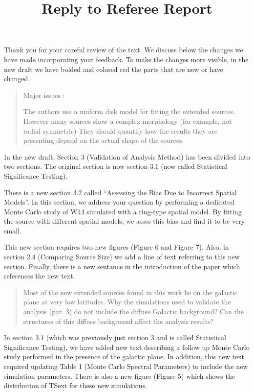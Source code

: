 \documentclass{article}
\title{Reply to Referee Report}
\newenvironment{referee}
{\begin{quote}\color{red}}
  {\end{quote}}
\newenvironment{reply}
  {}
  {}
\begin{document}
\maketitle

\begin{reply}
Thank you for your careful review of the text. We discuss below the
changes we have made incorporating your feedback. To make the changes more visible,
in the new draft we have bolded and colored red the parts that are new or have changed.
\end{reply}

\begin{referee}
Major issues :

The authors use a uniform disk model for fitting the extended sources.
However many sources show a complex morphology (for example, not radial symmetric)
They should quantify how the results they are presenting depend on the actual shape of the sources.
\end{referee}


\begin{reply}
In the new draft, Section 3 (Validation of Analysis Method) has been
divided into two sections. The original section is now section 3.1
(now called Statistical Significance Testing).

There is a new section 3.2 called ``Assessing the Bias Due to Incorrect
Spatial Models''. In this section, we address your question by performing
a dedicated Monte Carlo study of W44 simulated with a ring-type spatial
model. By fitting the source with different spatial models, we asses
this bias and find it to be very small.

This new section requires two new figures (Figure 6 and Figure 7). Also,
in section 2.4 (Comparing Source Size) we add a line of text referring
to this new section. Finally, there is a new sentance in the introduction
of the paper which references the new text.
\end{reply}


\begin{referee}
Most of the new extended sources found in this work lie on the galactic
plane at very low latitudes. Why the simulations used to validate the
analysis (par. 3) do not include the diffuse Galactic background? Can
the structures of this diffuse background affect the analysis results?
\end{referee}

\begin{reply}
In section 3.1 (which was previously just section 3 and is called
Statistical Significance Testing), we have added new text describing a
follow up Monte Carlo study performed in the presence of the galactic
plane. In addition, this new text required updating Table 1 (Monte Carlo
Spectral Parameters) to include the new simulation parameters. There is also
a new figure (Figure 5) which shows the distribution of TSext for these
new simulations.
\end{reply}
\end{document}
